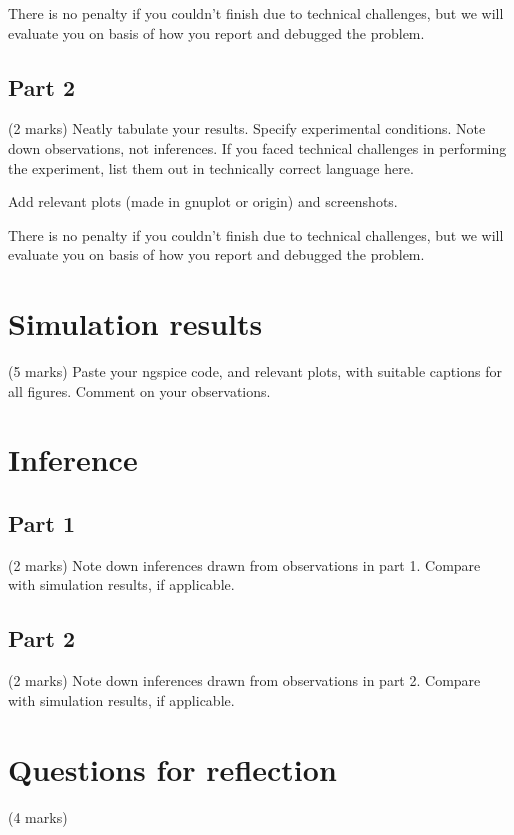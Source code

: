 \documentclass[12pt]{article}
\begin{document}
There is no penalty if you couldn't finish due to technical challenges, but we will evaluate you on basis of how you report and debugged the problem.

\subsection{Part 2}

(2 marks) Neatly tabulate your results. Specify experimental conditions. Note down observations, not inferences. If you faced technical challenges in performing the experiment, list them out in technically correct language here.

Add relevant plots (made in gnuplot or origin) and screenshots.

There is no penalty if you couldn't finish due to technical challenges, but we will evaluate you on basis of how you report and debugged the problem.

\section{Simulation results}

(5 marks) Paste your ngspice code, and relevant plots, with suitable captions for all figures. Comment on your observations.

\section{Inference}

\subsection{Part 1}

(2 marks) Note down inferences drawn from observations in part 1. Compare with simulation results, if applicable.

\subsection{Part 2}

(2 marks) Note down inferences drawn from observations in part 2. Compare with simulation results, if applicable.

\section{Questions for reflection}

(4 marks)
\end{document}
